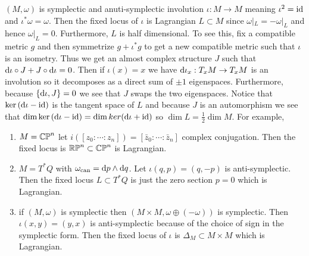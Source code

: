 \documentclass[12pt]{article}
\begin{document}
\begin{example}
$(M, \omega)$ is symplectic and anuti-symplectic involution $\iota : M \to M$ meaning $\iota^2 = \mathrm{id}$ and $\iota^* \omega = \omega$. Then the fixed locus of $\iota$ is Lagrangian $L \subset M$ since $\omega|_L = -\omega|_L$ and hence $\omega|_L = 0$. Furthermore, $L$ is half dimensional. To see this, fix a compatible metric $g$ and then symmetrize $g + \iota^* g$ to get a new compatible metric such that $\iota$ is an isometry. Thus we get an almost complex structure $J$ such that $\mathrm{d}{\iota} \circ J + J \circ \mathrm{d}{\iota} = 0$. Then if $\iota(x) = x$ we have $\mathrm{d}{\iota_x} : T_x M \to T_x M$ is an involution so it decomposes as a direct sum of $\pm 1$ eigenspaces. Furthermore, because $\{ \mathrm{d}{\iota}, J \} = 0$ we see that $J$ swaps the two eigenspaces. Notice that $\ker{(\mathrm{d}{\iota} - \mathrm{id})}$ is the tangent space of $L$ and because $J$ is an automorphism we see that $\dim{\ker{(\mathrm{d}{\iota} - \mathrm{id})}} = \dim{ker{(\mathrm{d}{\iota} + \mathrm{id})}}$ so $\dim{L} = \tfrac{1}{2} \dim{M}$.
For example,
\begin{enumerate}
\item $M = \mathbb{CP}^n$ let $i([z_0 : \cdots : z_n]) = [\bar{z}_0 : \cdots : \bar{z}_n]$ complex conjugation. Then the fixed locus is $\mathbb{RP}^n \subset \mathbb{CP}^n$ is Lagrangian.

\item $M = T^* Q$ with $\omega_{\text{can}} = \mathrm{d}{p} \wedge \mathrm{d}{q}$. Let $\iota(q, p) = (q, -p)$ is anti-symplectic. Then the fixed locus $L \subset T^* Q$ is just the zero section $p = 0$ which is Lagrangian.

\item if $(M, \omega)$ is symplectic then $(M \times M, \omega \oplus (-\omega))$ is symplectic. Then $\iota(x,y) = (y,x)$ is anti-symplectic because of the choice of sign in the symplectic form. Then the fixed locus of $\iota$ is $\Delta_M \subset M \times M$ which is Lagrangian.
\end{enumerate}
\end{example}
\end{document}
